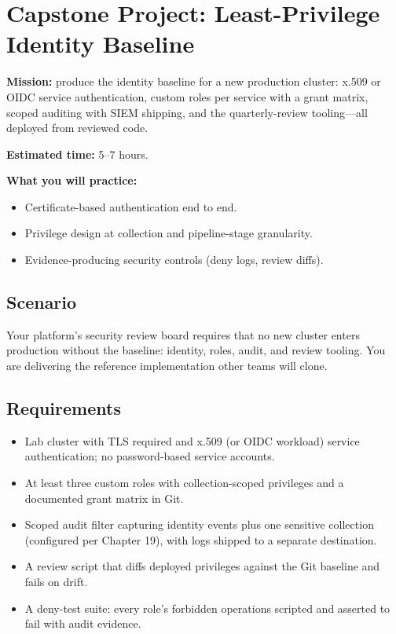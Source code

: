 \section{Capstone Project: Least-Privilege Identity Baseline}\label{sec:ch17-capstone}

\begin{capstonebox}
\textbf{Mission:} produce the identity baseline for a new production cluster: x.509 or OIDC service authentication, custom roles per service with a grant matrix, scoped auditing with SIEM shipping, and the quarterly-review tooling---all deployed from reviewed code.

\textbf{Estimated time:} 5--7 hours.

\textbf{What you will practice:}
\begin{itemize}
    \item Certificate-based authentication end to end.
    \item Privilege design at collection and pipeline-stage granularity.
    \item Evidence-producing security controls (deny logs, review diffs).
\end{itemize}
\end{capstonebox}

\subsection*{Scenario}
Your platform's security review board requires that no new cluster enters production without the baseline: identity, roles, audit, and review tooling. You are delivering the reference implementation other teams will clone.

\subsection*{Requirements}
\begin{itemize}
    \item Lab cluster with TLS required and x.509 (or OIDC workload) service authentication; no password-based service accounts.
    \item At least three custom roles with collection-scoped privileges and a documented grant matrix in Git.
    \item Scoped audit filter capturing identity events plus one sensitive collection (configured per Chapter 19), with logs shipped to a separate destination.
    \item A review script that diffs deployed privileges against the Git baseline and fails on drift.
    \item A deny-test suite: every role's forbidden operations scripted and asserted to fail with audit evidence.
\end{itemize}


